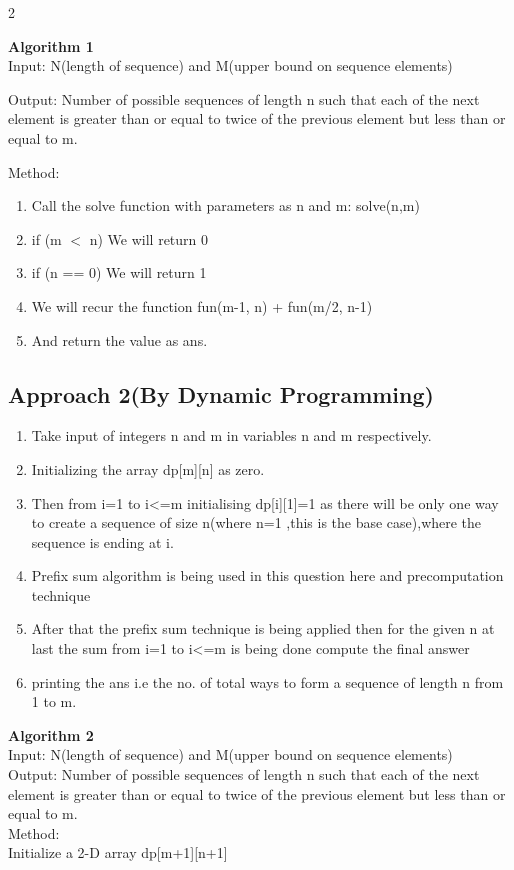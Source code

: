 2\documentclass[conference]{IEEEtran}
\begin{document}
\textbf{Algorithm 1}\\
{Input:} N(length of sequence) and M(upper bound on sequence elements)

{Output:} Number of possible sequences of length n such that each of the next element is greater than or equal to twice of the previous element but less than or equal to m.

{Method:}
\begin{enumerate}
\item Call the solve function with parameters as n and m: solve(n,m)
\item if (m $\displaystyle<$ n) We will return 0 
\item if (n == 0) We will return 1 
\item We will recur the function fun(m-1, n) + fun(m/2, n-1)
\item And return the value as ans.
\end{enumerate}


\subsection{ \textbf{Approach  2(By Dynamic Programming)}}
\begin{enumerate}
\item Take input of integers n and m in variables n and m respectively. 
\item Initializing the array dp[m][n] as  zero.
\item Then from i=1 to i<=m initialising dp[i][1]=1 as there will be only one way to create a sequence of size n(where n=1 ,this is the base case),where the sequence is ending at i.
\item Prefix sum algorithm is being used in this question here and precomputation technique
\item After that the prefix sum technique is being applied then for the given n at last the sum from i=1 to i<=m is being done compute the final answer
\item printing the ans i.e the no. of total ways to form a sequence of length n from 1 to m.
\end{enumerate}

\textbf{Algorithm 2}\\
{Input:} N(length of sequence) and M(upper bound on sequence elements)\\
{Output:} Number of possible sequences of length n such that each of the next element is greater than or equal to twice of the previous element but less than or equal to m.\\
Method:\\
Initialize a 2-D array dp[m+1][n+1]\\
\end{document}
